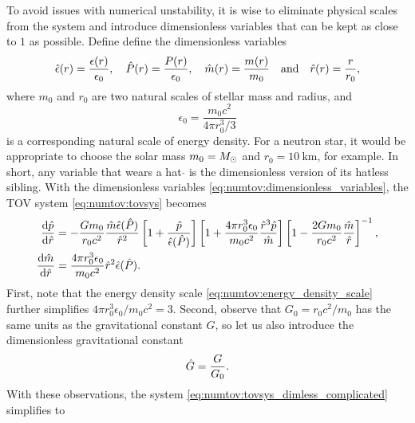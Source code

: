To avoid issues with numerical unstability, it is wise to eliminate physical scales from the system and introduce dimensionless variables that can be kept as close to $1$ as possible.
Define define the dimensionless variables
\begin{equation}
	\hat{\epsilon}(r) = \frac{\epsilon(r)}{\epsilon_0}, \quad
	\hat{P}(r) = \frac{P(r)}{\epsilon_0}, \quad
	\hat{m}(r) = \frac{m(r)}{m_0} \quad \text{and} \quad
	\hat{r}(r) = \frac{r}{r_0},
\label{eq:numtov:dimensionless_variables}
\end{equation}
where $m_0$ and $r_0$ are two natural scales of stellar mass and radius, and
\begin{equation}
	\epsilon_0 = \frac{m_0 c^2}{4 \pi r_0^3 / 3}
\label{eq:numtov:energy_density_scale}
\end{equation}
is a corresponding natural scale of energy density.
For a neutron star, it would be appropriate to choose the solar mass $m_0 = M_\odot$ and $r_0 = \SI{10}{\kilo\meter}$, for example.
In short, any variable that wears a hat $\hat{}$ is the dimensionless version of its hatless sibling.
With the dimensionless variables \eqref{eq:numtov:dimensionless_variables}, the TOV system \eqref{eq:numtov:tovsys} becomes
\begin{subequations}
\label{eq:numtov:tovsys_dimless_complicated}
\begin{align}
	\odv{\diml{p}}{\diml{r}} &= -\frac{G m_0}{r_0 c^2} \frac{\diml{m} \diml{\epsilon}(\diml{P})}{\diml{r}^2} \left[ 1 + \frac{\diml{p}}{\diml{\epsilon}(\diml{P})} \right] \left[ 1 + \frac{4 \pi r_0^3 \epsilon_0}{m_0 c^2} \frac{\diml{r}^3 \diml{p}}{\diml{m}} \right] \left[ 1 - \frac{2 G m_0}{r_0 c^2} \frac{\diml{m}}{\diml{r}} \right]^{-1} , \\
	\odv{\diml{m}}{\diml{r}} &= \frac{4 \pi r_0^3 \epsilon_0}{m_0 c^2} \diml{r}^2\diml{\epsilon}(\diml{P}) .
\end{align}
\end{subequations}
First, note that the energy density scale \eqref{eq:numtov:energy_density_scale} further simplifies $4 \pi r_0^3 \epsilon_0 / m_0 c^2 = 3$.
Second, observe that $G_0 = r_0 c^2 / m_0$ has the same units as the gravitational constant $G$, so let us also introduce the dimensionless gravitational constant
\begin{equation}
	\hat{G} = \frac{G}{G_0} .
\end{equation}
With these observations, the system \eqref{eq:numtov:tovsys_dimless_complicated} simplifies to
